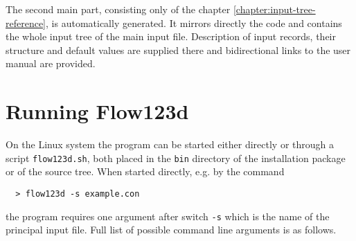 \documentclass[12pt,a4paper]{report}
\begin{document}
The second main part, consisting only of the chapter \ref{chapter:input-tree-reference}, is automatically
generated. It mirrors directly the code and contains the whole input tree of the main input file. Description
of input records, their structure and default values are supplied there and bidirectional links to the user 
manual are provided.


\section{Running Flow123d}
On the Linux system the program can be started either directly or through a script \verb'flow123d.sh', both placed in the \verb'bin' directory of the installation 
package or of the source tree. When started directly, e.g. by the command
\begin{verbatim}
  > flow123d -s example.con
\end{verbatim}
the program requires one argument after switch \verb'-s' which is the name of the principal input file. Full list of possible command line arguments is as follows.

\end{document}
